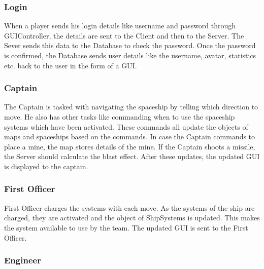 \subsubsection*{Login}


When a player sends his login details like username and password through GUIController, the details are sent to the Client and then to the Server. The Sever sends this data to the Database to check the password. Once the password is confirmed, the Database sends user details like the username, avatar, statistics etc. back to the user in the form of a GUI.

\subsubsection*{Captain}


The Captain is tasked with navigating the spaceship by telling which direction to move. He also has other tasks like commanding when to use the spaceship systems which have been activated. These commands all update the objects of maps and spaceships based on the commands. In case the Captain commands to place a mine, the map stores details of the mine. If the Captain shoots a missile, the Server should calculate the blast effect. After these updates, the updated GUI is displayed to the captain.

\subsubsection*{First Officer}


First Officer charges the systems with each move. As the systems of the ship are charged, they are activated and the object of ShipSystems is updated. This makes the system available to use by the team. The updated GUI is sent to the First Officer.

\subsubsection*{Engineer}


